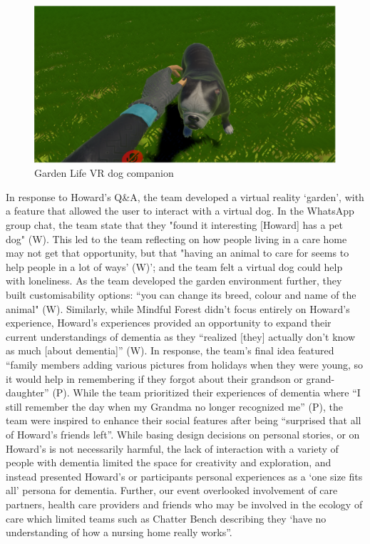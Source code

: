 \begin{figure}[htp]
\centering
\includegraphics[width=.8\linewidth]{Images/DemVR/Findings/GadenLifeVR.png}
\caption{Garden Life VR dog companion}
\label{fig:GardenLifeDog}
\end{figure}

In response to Howard’s Q\&A, the team developed a virtual reality ‘garden’, with a feature that allowed the user to interact with a virtual dog. In the WhatsApp group chat, the team state that they "found it interesting [Howard] has a pet dog" (W). This led to the team reflecting on how people living in a care home may not get that opportunity, but that "having an animal to care for seems to help people in a lot of ways' (W)'; and the team felt a virtual dog could help with loneliness. As the team developed the garden environment further, they built customisability options: “you can change its breed, colour and name of the animal" (W). Similarly, while Mindful Forest didn’t focus entirely on Howard’s experience, Howard’s experiences provided an opportunity to expand their current understandings of dementia as they “realized [they] actually don’t know as much [about dementia]” (W). In response, the team’s final idea featured “family members adding various pictures from holidays when they were young, so it would help in remembering if they forgot about their grandson or grand-daughter” (P). While the team prioritized their experiences of dementia where “I still remember the day when my Grandma no longer recognized me” (P),  the team were inspired to enhance their social features after being “surprised that all of Howard’s friends left”.  While basing design decisions on personal stories, or on Howard’s is not necessarily harmful, the lack of interaction with a variety of people with dementia limited the space for creativity and exploration, and instead presented Howard’s or participants personal experiences as a ‘one size fits all’ persona for dementia. Further, our event overlooked involvement of care partners, health care providers and friends who may be involved in the ecology of care which limited teams such as Chatter Bench describing they ‘have no understanding of how a nursing home really works”. 

